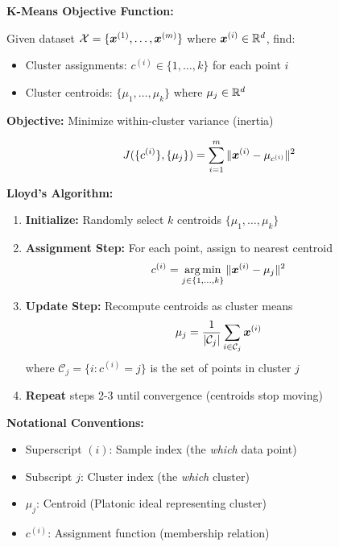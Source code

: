 \begin{seanbox}{4.1}
\textbf{K-Means Objective Function:}

Given dataset $\mathcal{X} = \{\bm{x}^{(1)}, \ldots, \bm{x}^{(m)}\}$ where $\bm{x}^{(i)} \in \mathbb{R}^d$, find:

\begin{itemize}
    \item Cluster assignments: $c^{(i)} \in \{1, \ldots, k\}$ for each point $i$
    \item Cluster centroids: $\{\mu_1, \ldots, \mu_k\}$ where $\mu_j \in \mathbb{R}^d$
\end{itemize}

\textbf{Objective:} Minimize within-cluster variance (inertia)

\begin{equation}
    J(\{c^{(i)}\}, \{\mu_j\}) = \sum_{i=1}^m \| \bm{x}^{(i)} - \mu_{c^{(i)}} \|^2
\end{equation}

\textbf{Lloyd's Algorithm:}

\begin{enumerate}
    \item \textbf{Initialize:} Randomly select $k$ centroids $\{\mu_1, \ldots, \mu_k\}$
    
    \item \textbf{Assignment Step:} For each point, assign to nearest centroid
    \begin{equation}
        c^{(i)} = \operatorname*{arg\,min}_{j \in \{1,\ldots,k\}} \| \bm{x}^{(i)} - \mu_j \|^2
    \end{equation}
    
    \item \textbf{Update Step:} Recompute centroids as cluster means
    \begin{equation}
        \mu_j = \frac{1}{|\mathcal{C}_j|} \sum_{i \in \mathcal{C}_j} \bm{x}^{(i)}
    \end{equation}
    where $\mathcal{C}_j = \{i : c^{(i)} = j\}$ is the set of points in cluster $j$
    
    \item \textbf{Repeat} steps 2-3 until convergence (centroids stop moving)
\end{enumerate}

\textbf{Notational Conventions:}
\begin{itemize}
    \item Superscript $(i)$: Sample index (the \textit{which} data point)
    \item Subscript $j$: Cluster index (the \textit{which} cluster)
    \item $\mu_j$: Centroid (Platonic ideal representing cluster)
    \item $c^{(i)}$: Assignment function (membership relation)
\end{itemize}
\end{seanbox}


